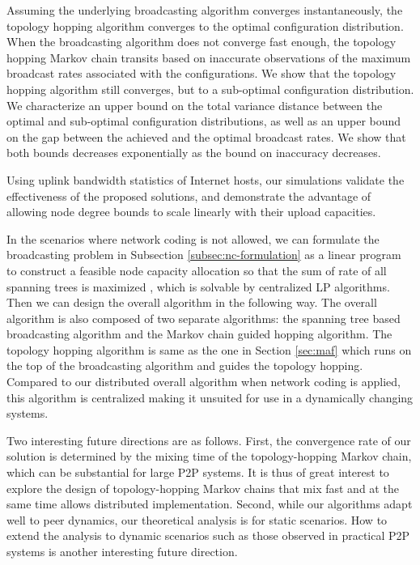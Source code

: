 \documentclass[10pt,conference]{IEEEtran}
\begin{document}
Assuming the underlying broadcasting algorithm converges instantaneously,
the topology hopping algorithm converges to the optimal configuration
distribution. When the broadcasting algorithm does not converge fast enough,
the topology hopping Markov chain transits based on inaccurate observations of the maximum broadcast rates associated with the configurations.
We show that the topology hopping algorithm still converges, but to a sub-optimal configuration distribution. We characterize an upper bound on the total variance
distance between the optimal and sub-optimal configuration distributions, as well as an upper bound on the gap between the achieved and the optimal broadcast rates. We show that both bounds decreases exponentially as the bound on inaccuracy decreases.

Using uplink bandwidth statistics of Internet hosts, our simulations
validate the effectiveness of the proposed solutions, and demonstrate
the advantage of allowing node degree bounds to scale linearly with
their upload capacities.

In the scenarios where network coding is not allowed, we can formulate the broadcasting problem in Subsection \ref{subsec:nc-formulation} as a linear program to construct a feasible node capacity allocation so that the sum of rate of all spanning
trees is maximized \cite{streaming_capacity.allerton09}, which is solvable by centralized LP algorithms. Then we can design the overall algorithm in the following way. The overall algorithm is also composed of two separate algorithms: the spanning tree based broadcasting algorithm and the Markov chain guided hopping algorithm. The topology hopping algorithm is same as the one in Section \ref{sec:maf} which runs on the top of the broadcasting algorithm and guides the topology hopping. Compared to our distributed overall algorithm when network coding is applied, this algorithm is centralized making it unsuited for use in a dynamically changing systems.

Two interesting future directions are as follows. First,
the convergence rate of our solution is determined by the mixing time
of the topology-hopping Markov chain, which can be substantial for
large P2P systems. It is thus of great interest to explore the
design of topology-hopping Markov chains that mix fast and at the
same time allows distributed implementation. Second, while our algorithms adapt well to peer dynamics, our theoretical analysis is for static scenarios. How to extend the analysis to dynamic scenarios such as those observed in practical P2P systems \cite{wang2008stable} is another interesting future direction.
\end{document}
